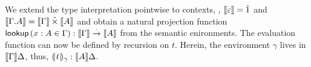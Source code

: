 \documentclass[a4paper,USenglish,cleveref, autoref]{lipics-v2019}
\begin{document}
We extend the type interpretation pointwise to contexts, \ie,
$\den \cempty = \hatone$ and
$\den{\cext \Gamma A} = \den \Gamma \hattimes \den A$
and obtain a natural projection function
$\tlookup\,(x : A \in \Gamma) : \den \Gamma \todot \den A$
from the semantic enironments.
The evaluation function
can now be defined by recursion on $t$.
Herein, the environment $\gamma$ lives in $\den \Gamma \Delta$, thus, $\dent t \gamma : \den A \Delta$.
\end{document}
